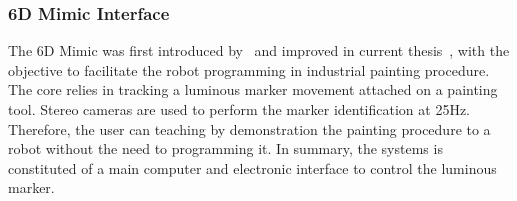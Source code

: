\begin{table}[h!]
\end{table}


\subsubsection{6D Mimic Interface}
\label{cap4:modular_grasping_architecture:sec:grasping_synthesis:subsec:mimic_grasping:subsubsec:6dmimic_interface}

The 6D Mimic was first introduced by~\cite{ferreira2016stereo} and improved in current thesis~\cite{6dmimicIMU}, with the objective to facilitate the robot programming in industrial painting procedure. The core relies in tracking a luminous marker movement attached on a painting tool. Stereo cameras are used to perform the marker identification at 25Hz. Therefore, the user can teaching by demonstration the painting procedure to a robot without the need to programming it. In summary, the systems is constituted of a main computer and electronic interface to control the luminous marker.

